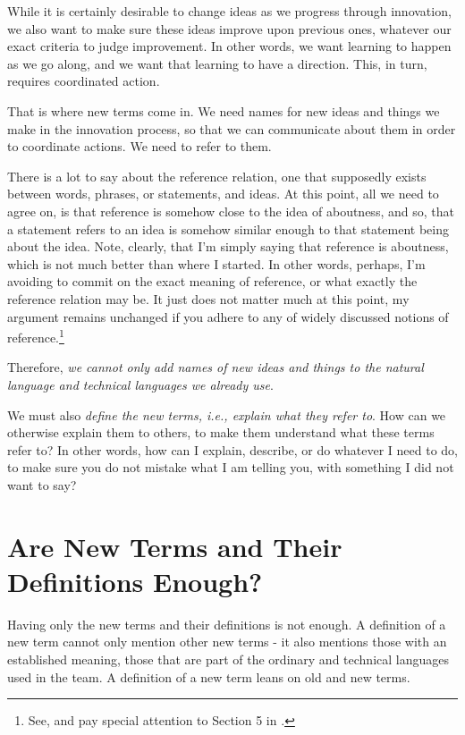 \documentclass[graybox,envcountchap,sectrefs]{svmono}
\begin{document}
While it is certainly desirable to change ideas as we progress through innovation, we also want to make sure these ideas improve upon previous ones, whatever our exact criteria to judge improvement. In other words, we want learning to happen as we go along, and we want that learning to have a direction. This, in turn, requires  coordinated action.

That is where new terms come in. We need names for new ideas and things we make in the innovation process, so that we can communicate about them in order to coordinate actions. We need to refer to them.

There is a lot to say about the reference relation, one that supposedly exists between words, phrases, or statements, and ideas. At this point, all we need to agree on, is that reference is somehow close to the idea of aboutness, and so, that a statement refers to an idea is somehow similar enough to that statement being about the idea. Note, clearly, that I'm simply saying that reference is aboutness, which is not much better than where I started. In other words, perhaps, I'm avoiding to commit on the exact meaning of reference, or what exactly the reference relation may be. It just does not matter much at this point, my argument remains unchanged if you adhere to any of widely discussed notions of reference.\footnote{See, and pay special attention to Section 5 in \cite{Michaelson2019}.}

Therefore, \textit{we cannot only add names of new ideas and things to the natural language and technical languages we already use}. 

We must also \textit{define the new terms, i.e., explain what they refer to}. How can we otherwise explain them to others, to make them understand what these terms refer to? In other words, how can I explain, describe, or do whatever I need to do, to make sure you do not mistake what I am telling you, with something I did not want to say?


\section{Are New Terms and Their Definitions Enough?}
\label{c1-s10}
Having only the new terms and their definitions is not enough. A definition of a new term cannot only mention other new terms - it also mentions those with an established meaning, those that are part of the ordinary and technical languages used in the team. A definition of a new term leans on old and new terms.
\end{document}
